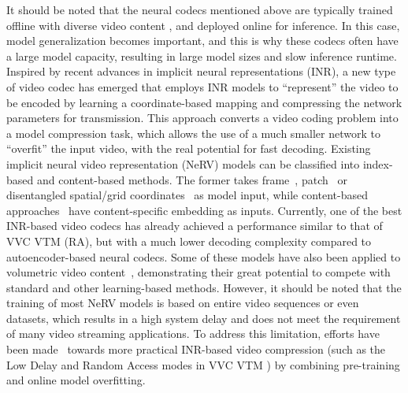 \documentclass[11pt,a4paper]{article}
\begin{document}
It should be noted that the neural codecs mentioned above are typically trained offline with diverse video content \cite{nawala2024bvi}, and deployed online for inference. In this case, model generalization becomes important, and this is why these codecs often have a large model capacity, resulting in large model sizes and slow inference runtime. Inspired by recent advances in implicit neural representations (INR), a new type of video codec has emerged that employs INR models to ``represent'' the video to be encoded by learning a coordinate-based mapping and compressing the network parameters for transmission. This approach converts a video coding problem into a model compression task, which allows the use of a much smaller network to ``overfit'' the input video, with the real potential for fast decoding. Existing implicit neural video representation (NeRV) models can be classified into index-based and content-based methods. The former takes frame~\cite{chen2021nerv}, patch~\cite{bai2023ps} or disentangled spatial/grid coordinates~\cite{li2022nerv} as model input, while content-based approaches~\cite{kwan2024hinerv,kim2024c3,leguay2024cool} have content-specific embedding as inputs. Currently, one of the best INR-based video codecs \cite{kwan2024nvrc} has already achieved a performance similar to that of VVC VTM (RA), but with a much lower decoding complexity compared to autoencoder-based neural codecs. Some of these models have also been applied to volumetric video content~\cite{ruan2024point,kwan2024immersive}, demonstrating their great potential to compete with standard and other learning-based methods. However, it should be noted that the training of most NeRV models is based on entire video sequences or even datasets, which results in a high system delay and does not meet the requirement of many video streaming applications. To address this limitation, efforts have been made~\cite{gao2024pnvc} towards more practical INR-based video compression (such as the Low Delay and Random Access modes in VVC VTM \cite{bossen2023vtmctc}) by combining pre-training and online model overfitting.

    
\end{document}
